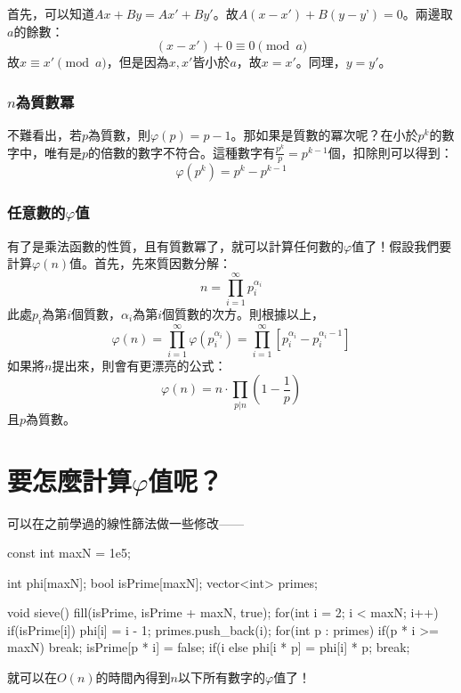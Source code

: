 \documentclass[main.tex]{subfiles}
\begin{document}
		首先，可以知道$Ax + By = Ax' + By'$。故$A(x - x') + B(y- y’) = 0$。兩邊取$a$的餘數：
		\begin{equation*}
			(x - x') + 0 \equiv 0 \pmod a
		\end{equation*}
		故$x \equiv x' \pmod a$，但是因為$x, x'$皆小於$a$，故$x = x'$。同理，$y = y'$。
	\subsubsection{$n$為質數冪}
		不難看出，若$p$為質數，則$\varphi(p) = p - 1$。那如果是質數的冪次呢？在小於$p^k$的數字中，唯有是$p$的倍數的數字不符合。這種數字有$\frac{p^k}{p} = p^{k - 1}$個，扣除則可以得到：
		\begin{equation*}
			\varphi(p^k) = p^k - p^{k - 1}
		\end{equation*}
	\subsubsection{任意數的$\varphi$值}
		有了是乘法函數的性質，且有質數冪了，就可以計算任何數的$\varphi$值了！假設我們要計算$\varphi(n)$值。首先，先來質因數分解：
		\begin{equation*}
			n = \prod_{i = 1}^{\infty} p_i^{\alpha_i}
		\end{equation*}
		此處$p_i$為第$i$個質數，$\alpha_i$為第$i$個質數的次方。則根據以上，
		\begin{equation*}
		\varphi(n) = \prod_{i = 1}^{\infty} \varphi(p_i^{\alpha_i}) = \prod_{i = 1}^{\infty} \left[p_i^{\alpha_i} - p_i^{\alpha_i - 1}\right]
		\end{equation*}
		如果將$n$提出來，則會有更漂亮的公式：
		\begin{equation*}
			\varphi(n) = n \cdot \prod_{p | n} (1 - \frac{1}{p})
		\end{equation*}
		且$p$為質數。

\section{要怎麼計算$\varphi$值呢？}
	可以在之前學過的線性篩法做一些修改——
\begin{C++}
const int maxN = 1e5;

int phi[maxN];
bool isPrime[maxN];
vector<int> primes;

void sieve(){
	fill(isPrime, isPrime + maxN, true);
	for(int i = 2; i < maxN; i++){
		if(isPrime[i]){
			phi[i] = i - 1;
			primes.push_back(i);
		}
		for(int p : primes){
			if(p * i >= maxN) break;
			isPrime[p * i] = false;
			if(i %
			else {
				phi[i * p] = phi[i] * p;
				break;
			}
		}
	}
}
\end{C++}
就可以在$O(n)$的時間內得到$n$以下所有數字的$\varphi$值了！	
\end{document}
